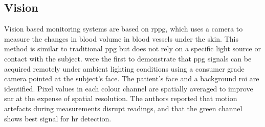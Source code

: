 \documentclass[11pt, parskip=half*,twoside=false]{scrbook}
\begin{document}
\subsection{Vision}
Vision based monitoring systems are based on \gls{rppg}, which uses a camera to measure the changes in blood volume in blood vessels under the skin. This method is similar to traditional \gls{ppg} but does not rely on a specific light source or contact with the subject. \citet{verkruysseRemotePlethysmographicImaging2008} were the first to demonstrate that \gls{ppg} signals can be acquired remotely under ambient lighting conditions using a consumer grade camera pointed at the subject's face. The patient's face and a background \gls{roi} are identified. Pixel values in each colour channel are spatially averaged to improve \gls{snr} at the expense of spatial resolution. The authors reported that motion artefacts during measurements disrupt readings, and that the green channel shows best signal for \gls{hr} detection.
\end{document}
